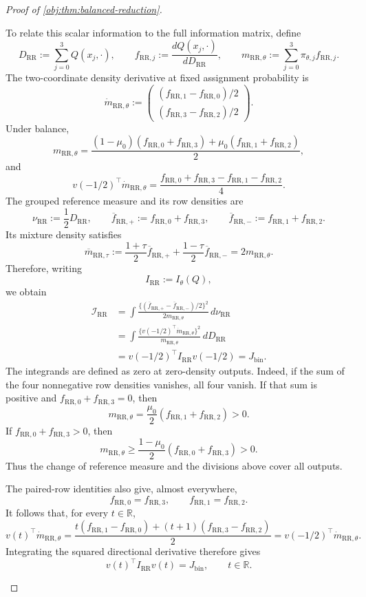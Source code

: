\begin{proof}[Proof of \cref{obj:thm:balanced-reduction}]
\begin{enumerate}
To relate this scalar information to the full information matrix, define
\[
D_{\mathrm{RR}}
:=\sum_{j=0}^3Q(x_j,\cdot),
\qquad
f_{\mathrm{RR},j}
:=\frac{dQ(x_j,\cdot)}{dD_{\mathrm{RR}}},
\qquad
m_{\mathrm{RR},\theta}
:=\sum_{j=0}^3\pi_{\theta,j}f_{\mathrm{RR},j}.
\]
The two-coordinate density derivative at fixed assignment probability is
\[
\dot m_{\mathrm{RR},\theta}
:=
\begin{pmatrix}
(f_{\mathrm{RR},1}-f_{\mathrm{RR},0})/2\\
(f_{\mathrm{RR},3}-f_{\mathrm{RR},2})/2
\end{pmatrix}.
\]
Under balance,
\[
m_{\mathrm{RR},\theta}
=
\frac{(1-\mu_0)(f_{\mathrm{RR},0}+f_{\mathrm{RR},3})
+\mu_0(f_{\mathrm{RR},1}+f_{\mathrm{RR},2})}{2},
\]
and
\[
v(-1/2)^\top\dot m_{\mathrm{RR},\theta}
=
\frac{f_{\mathrm{RR},0}+f_{\mathrm{RR},3}
-f_{\mathrm{RR},1}-f_{\mathrm{RR},2}}4.
\]
The grouped reference measure and its row densities are
\[
\nu_{\mathrm{RR}}:=\frac12D_{\mathrm{RR}},
\qquad
\overline f_{\mathrm{RR},+}
:=f_{\mathrm{RR},0}+f_{\mathrm{RR},3},
\qquad
\overline f_{\mathrm{RR},-}
:=f_{\mathrm{RR},1}+f_{\mathrm{RR},2}.
\]
Its mixture density satisfies
\[
\overline m_{\mathrm{RR},\tau}
:=\frac{1+\tau}{2}\overline f_{\mathrm{RR},+}
+\frac{1-\tau}{2}\overline f_{\mathrm{RR},-}
=2m_{\mathrm{RR},\theta}.
\]
Therefore, writing
\[
I_{\mathrm{RR}}:=I_\theta(Q),
\]
we obtain
\[
\begin{aligned}
\mathcal I_{\mathrm{RR}}
&=
\int
\frac{\{(\overline f_{\mathrm{RR},+}
-\overline f_{\mathrm{RR},-})/2\}^2}
{2m_{\mathrm{RR},\theta}}\,d\nu_{\mathrm{RR}}\\
&=
\int
\frac{\{v(-1/2)^\top\dot m_{\mathrm{RR},\theta}\}^2}
{m_{\mathrm{RR},\theta}}\,dD_{\mathrm{RR}}\\
&=v(-1/2)^\top I_{\mathrm{RR}}v(-1/2)
=J_{\mathrm{bin}}.
\end{aligned}
\]
The integrands are defined as zero at zero-density outputs. Indeed, if
the sum of the four nonnegative row densities vanishes, all four vanish.
If that sum is positive and
\(f_{\mathrm{RR},0}+f_{\mathrm{RR},3}=0\), then
\[
m_{\mathrm{RR},\theta}
=\frac{\mu_0}{2}
(f_{\mathrm{RR},1}+f_{\mathrm{RR},2})>0.
\]
If \(f_{\mathrm{RR},0}+f_{\mathrm{RR},3}>0\), then
\[
m_{\mathrm{RR},\theta}
\ge\frac{1-\mu_0}{2}
(f_{\mathrm{RR},0}+f_{\mathrm{RR},3})>0.
\]
Thus the change of reference measure and the divisions above cover all
outputs.

The paired-row identities also give, almost everywhere,
\[
f_{\mathrm{RR},0}=f_{\mathrm{RR},3},
\qquad
f_{\mathrm{RR},1}=f_{\mathrm{RR},2}.
\]
It follows that, for every \(t\in\mathbb R\),
\[
v(t)^\top\dot m_{\mathrm{RR},\theta}
=
\frac{t(f_{\mathrm{RR},1}-f_{\mathrm{RR},0})
+(t+1)(f_{\mathrm{RR},3}-f_{\mathrm{RR},2})}{2}
=
v(-1/2)^\top\dot m_{\mathrm{RR},\theta}.
\]
Integrating the squared directional derivative therefore gives
\[
v(t)^\top I_{\mathrm{RR}}v(t)=J_{\mathrm{bin}},
\qquad t\in\mathbb R.
\]


\end{enumerate}
\end{proof}
